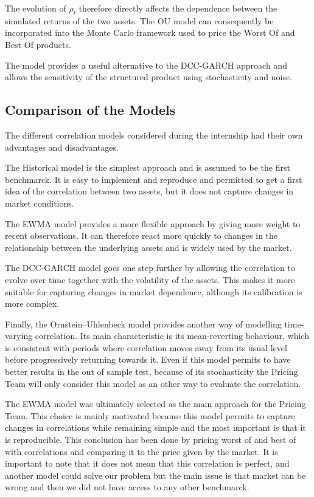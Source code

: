 \documentclass{article}
\begin{document}
The evolution of $\rho_t$ therefore directly affects the dependence
between the simulated returns of the two assets. The OU model can
consequently be incorporated into the Monte Carlo framework used to
price the Worst Of and Best Of products.


The model provides a useful alternative to the DCC-GARCH approach and allows the sensitivity of the structured product using stochasticity and noise.


\subsection{Comparison of the Models}

The different correlation models considered during the internship had their own advantages and disadvantages.

The Historical model is the simplest approach and is assumed to be the first benchmarck. It is easy to implement and reproduce and permitted to get a first idea of the correlation between two assets, but it does not capture changes in market conditions.

The EWMA model provides a more flexible approach by giving more weight to recent observations. It can therefore react more quickly to changes in the relationship between the underlying assets and is widely used by the market.

The DCC-GARCH model goes one step further by allowing the correlation to evolve over time together with the volatility of the assets. This makes it more suitable for capturing changes in market dependence, although its calibration is more complex.

Finally, the Ornstein–Uhlenbeck model provides another way of modelling time-varying correlation. Its main characteristic is its mean-reverting behaviour, which is consistent with periods where correlation moves away from its usual level before progressively returning towards it. Even if this model permits to have better results in the out of sample test, because of its stochasticity the Pricing Team will only consider this model as an other way to evaluate the correlation.

The EWMA model was ultimately selected as the main approach for the Pricing Team. This choice is mainly motivated because this model permits to capture changes in correlations while remaining simple and the most important is that it is reproducible. This conclusion has been done by pricing worst of and best of with correlations and comparing it to the price given by the market. It is important to note that it does not mean that this correlation is perfect, and another model could solve our problem but the main issue is that market can be wrong and then we did not have access to any other benchmarck.
\end{document}
